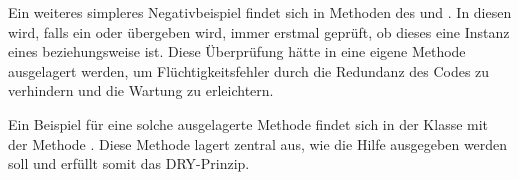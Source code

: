 Ein weiteres simpleres Negativbeispiel findet sich in Methoden des  und . In diesen wird, falls ein  oder  übergeben wird, immer erstmal geprüft, ob dieses eine Instanz eines  beziehungsweise  ist. Diese Überprüfung hätte in eine eigene Methode ausgelagert werden, um Flüchtigkeitsfehler durch die Redundanz des Codes zu verhindern und die Wartung zu erleichtern.

Ein Beispiel für eine solche ausgelagerte Methode findet sich in der Klasse  mit der Methode . Diese Methode lagert zentral aus, wie die Hilfe ausgegeben werden soll und erfüllt somit das DRY-Prinzip.